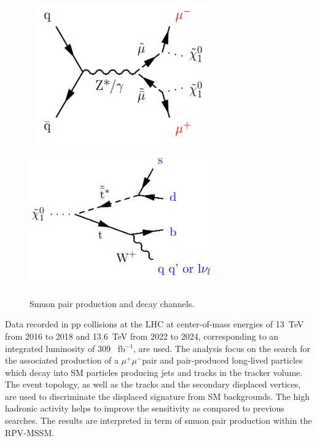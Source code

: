 \documentclass{cernatlasnote}
\newcommand{\mumu}{\ensuremath{\mu^{+}\mu^{-}}}
\newcommand{\fbinv}{\! fb$^{-1}$\xspace}
\begin{document}
\begin{figure}[ht]
\centering
\includegraphics[height=6cm, width=8cm, trim= 0cm 0cm 0cm 0.cm,clip]{images/Feynmann/smuprod.png}\includegraphics[height=6cm, width=8cm, trim= 0cm 0cm 0cm 0.cm,clip]{images/Feynmann/ChiDecay.png}
\caption{\label{fig:Feyn} Smuon pair production and decay channels.}
\end{figure}

Data recorded in pp collisions at the LHC at center-of-mass energies of 13~TeV from 2016 to 2018 and 13.6~TeV from 2022 to 2024, corresponding to an integrated luminosity of 309~\fbinv, are used. 
The analysis focus on the search for the associated production of a \mumu pair and pair-produced long-lived particles which decay into SM particles producing jets and tracks in the tracker volume. The event topology, as well as the tracks and the secondary displaced vertices, are used to discriminate the displaced signature from SM backgrounds. The high hadronic activity helps to improve the sensitivity as compared to previous searches. The results are interpreted in term of smuon pair production within the RPV-MSSM.


\end{document}
